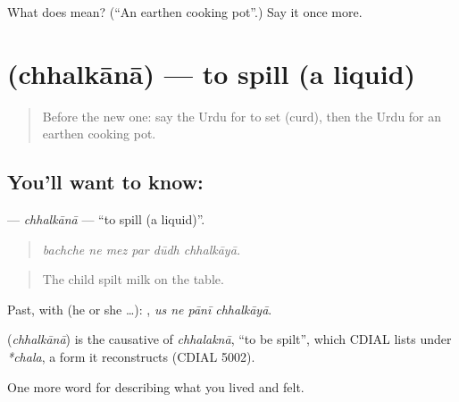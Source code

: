 \begin{tcolorbox}[breakable,colback=teal!4,colframe=teal!35!black,title={Before you move on}]
What does  mean? (\textquotedblleft{}An earthen cooking pot\textquotedblright{}.) Say it once more.
\end{tcolorbox}
\section[\texorpdfstring{\ur{چھلکانا} (chhalkānā)}{چھلکانا (chhalkānā)}]{ (chhalkānā) — to spill (a liquid)}

\label{lesson:UR-C509-chhalkana}



\begin{quote}
Before the new one: say the Urdu for to set (curd), then the Urdu for an earthen cooking pot.
\end{quote}

\subsection*{You'll want to know: }
\textbf{} — \emph{chhalkānā} — \textquotedblleft{}to spill (a liquid)\textquotedblright{}.

\begin{quote}
     
\end{quote}

\begin{quote}
\emph{bachche ne mez par dūdh chhalkāyā.}
\end{quote}

\begin{quote}
The child spilt milk on the table.
\end{quote}

Past, with  (he or she …):    , \emph{us ne pānī chhalkāyā}.

\begin{cousinweb}
\textbf{} (\emph{chhalkānā}) is the causative of \emph{chhalaknā}, \textquotedblleft{}to be spilt\textquotedblright{}, which CDIAL lists under \emph{*chala}, a form it reconstructs (CDIAL 5002).
\end{cousinweb}

\begin{grammarlens}[title={What you've built}]
One more word for describing what you lived and felt.
\end{grammarlens}

